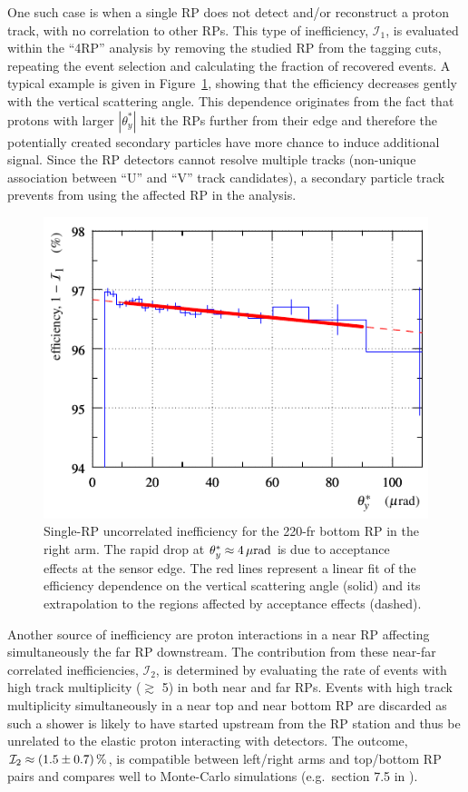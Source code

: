 One such case is when a single RP does not detect and/or reconstruct a proton track, with no correlation to other RPs. This type of inefficiency, $\mathcal{I}_1$, is evaluated within the ``4RP'' analysis by removing the studied RP from the tagging cuts, repeating the event selection and calculating the fraction of recovered events. A typical example is given in Figure~\ref{fig:eff uncorr}, showing that the efficiency decreases gently with the vertical scattering angle. This dependence originates from the fact that protons with larger $|\theta_y^*|$ hit the RPs further from their edge and therefore the potentially created secondary particles have more chance to induce additional signal. Since the RP detectors cannot resolve multiple tracks (non-unique association between ``U'' and ``V'' track candidates), a secondary particle track prevents from using the affected RP in the analysis.

\begin{figure}
\begin{center}
\includegraphics{fig/eff3outof4_fits.pdf}
\caption{%
Single-RP uncorrelated inefficiency for the 220-fr bottom RP in the right arm. The rapid drop at $\theta_y^* \approx 4\,{\rm \mu rad}$ is due to acceptance effects at the sensor edge. The red lines represent a linear fit of the efficiency dependence on the vertical scattering angle (solid) and its extrapolation to the regions affected by acceptance effects (dashed).
}
\label{fig:eff uncorr}
\end{center}
\end{figure}

Another source of inefficiency are proton interactions in a near RP affecting simultaneously the far RP downstream. The contribution from these near-far correlated inefficiencies, $\mathcal{I}_2$, is determined by evaluating the rate of events with high track multiplicity ($\gtrsim$ 5) in both near and far RPs. Events with high track multiplicity simultaneously in a near top and near bottom RP are discarded as such a shower is likely to have started upstream from the RP station and thus be unrelated to the elastic proton interacting with detectors. The outcome, $\mathcal{I}_2 \approx (1.5 \pm 0.7)\,{\rm \%}$, is compatible between left/right arms and top/bottom RP pairs and compares well to Monte-Carlo simulations (e.g.~section 7.5 in \cite{hubert-thesis}).

